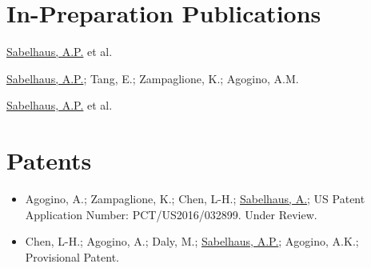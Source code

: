 \documentclass[letterpaper]{deedy-resume} %
\begin{document}
\section{In-Preparation Publications}

\vspace{0.2cm}

\begin{etaremune}


\item {} \underline{Sabelhaus, A.P.} et al.

\item {} \underline{Sabelhaus, A.P.}; Tang, E.; Zampaglione, K.; Agogino, A.M.
  
\item {} \underline{Sabelhaus, A.P.} et al.

\end{etaremune}


\section{Patents}

\vspace{0.2cm}

\begin{itemize}

\item {} Agogino, A.; Zampaglione, K.; Chen, L-H.; \underline{Sabelhaus, A.}; US Patent Application Number: PCT/US2016/032899. Under Review.

\item {} Chen, L-H.; Agogino, A.; Daly, M.; \underline{Sabelhaus, A.P.}; Agogino, A.K.; Provisional Patent.

\end{itemize}
\end{document}
